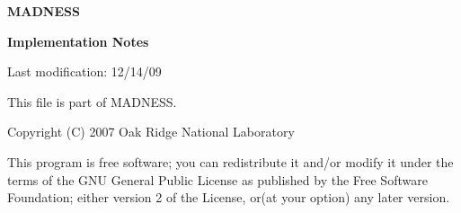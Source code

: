 \documentclass[letterpaper]{article}
\title{}
\author{}
\date{2010-01-18T22:18:15.19}
\begin{document}
\clearpage\setcounter{page}{1}\pagestyle{Licensepage}
\thispagestyle{Titlepage}

\bigskip


\bigskip


\bigskip


\bigskip


\bigskip


\bigskip


\bigskip


\bigskip


\bigskip


\bigskip

{\centering\bfseries
MADNESS
\par}

{\centering\bfseries
Implementation Notes
\par}


\bigskip


\bigskip


\bigskip


\bigskip


\bigskip


\bigskip


\bigskip


\bigskip


\bigskip


\bigskip


\bigskip

{\centering
Last modification: 12/14/09
\par}


\bigskip


\bigskip


\bigskip


\bigskip


\bigskip


\bigskip


\bigskip


\bigskip


\bigskip


\bigskip


\bigskip


\bigskip


\bigskip


\bigskip


\bigskip

This file is part of MADNESS.

Copyright (C) 2007 Oak Ridge National Laboratory

This program is free software; you can redistribute it and/or modify it under the terms of the GNU General Public
License as published by the Free Software Foundation; either version 2 of the License, or(at your option) any later
version.
\end{document}
